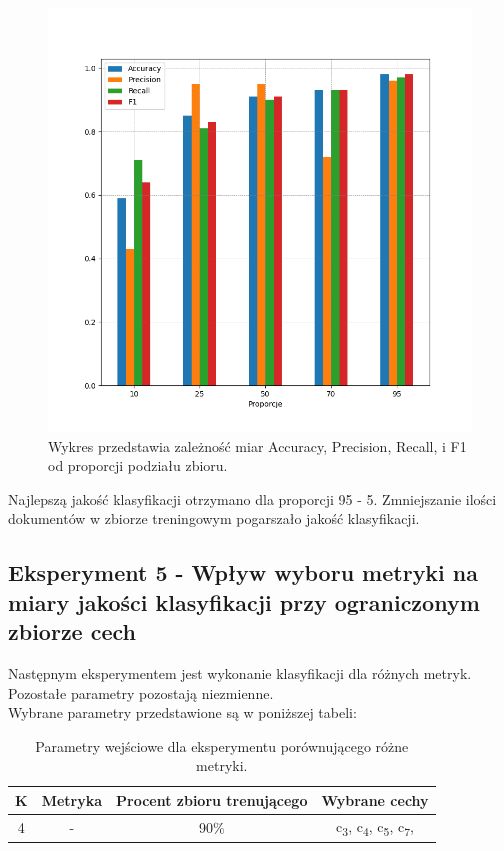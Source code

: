 \documentclass{classrep}
\begin{document}
\begin{figure}[h!]
 \centering
 \includegraphics[width=15cm]{wykres_proporcje.png}
 \vspace{-0.3cm}
 \caption{Wykres przedstawia zależność miar Accuracy, Precision, Recall, i F1 od proporcji podziału zbioru.}
 \label{wykres4}
\end{figure}

\newpage


Najlepszą jakość klasyfikacji otrzymano dla proporcji 95 - 5. Zmniejszanie ilości dokumentów w zbiorze treningowym pogarszało jakość klasyfikacji.\\

\newpage


\subsection{Eksperyment 5 - Wpływ wyboru metryki na miary jakości klasyfikacji przy ograniczonym zbiorze cech}
\label{subsection:ex2}
Następnym eksperymentem jest wykonanie klasyfikacji dla różnych metryk. Pozostałe parametry pozostają niezmienne.\\

Wybrane parametry przedstawione są w poniższej tabeli:
 
\begin{table}[h!]
\caption{Parametry wejściowe dla eksperymentu porównującego różne metryki. }
\centering
\vspace{0.1cm}
 \begin{tabular}{c c c c}
    \textbf{K} & \textbf{Metryka}   & \textbf{Procent zbioru trenującego}  & \textbf{Wybrane cechy}   \\
\hline
4 & - & 90\% &  c\textsubscript{3},  c\textsubscript{4},  c\textsubscript{5},  c\textsubscript{7}, \\
\end {tabular}
\label {Parametry wejściowe dla eksperymentu porównującego różne metryki. }
\end{table}
\end{document}
